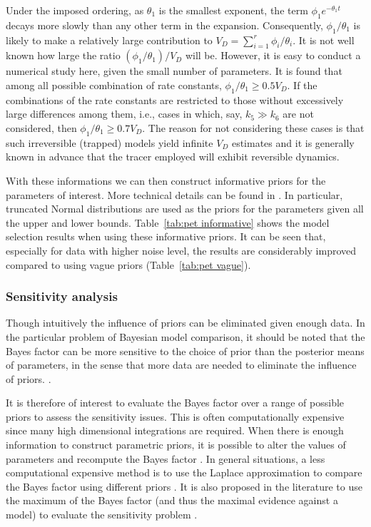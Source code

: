 Under the imposed ordering, as $\theta_1$ is the smallest exponent, the term
$\phi_1e^{-\theta_1 t}$ decays more slowly than any other term in the
expansion. Consequently, $\phi_1/\theta_1$ is likely to make a relatively
large contribution to $V_D = \sum_{i=1}^r \phi_i/\theta_i$. It is not well
known how large the ratio $(\phi_1/\theta_1)/V_D$ will be. However, it is
easy to conduct a numerical study here, given the small number of parameters.
It is found that among all possible combination of rate constants, $\phi_1/
\theta_1 \ge 0.5 V_D$. If the combinations of the rate constants are
restricted to those without excessively large differences among them, i.e.,
cases in which, say, $k_5 \gg k_6$ are not considered, then $\phi_1/\theta_1
\ge 0.7 V_D$. The reason for not considering these cases is that such
irreversible (trapped) models yield infinite $V_D$ estimates and it is
generally known in advance that the tracer employed will exhibit reversible
dynamics.

With these informations we can then construct informative priors for the
parameters of interest. More technical details can be found in
\cite{Zhou2013}. In particular, truncated Normal distributions are used as
the priors for the parameters given all the upper and lower bounds.
Table~\ref{tab:pet informative} shows the model selection results when using
these informative priors. It can be seen that, especially for data with
higher noise level, the results are considerably improved compared to using
vague priors (Table~\ref{tab:pet vague}).



\subsubsection{Sensitivity analysis}
\label{ssub:Sensitivity analysis}

Though intuitively the influence of priors can be eliminated given enough
data. In the particular problem of Bayesian model comparison, it should be
noted that the Bayes factor can be more sensitive to the choice of prior than
the posterior means of parameters, in the sense that more data are needed to
eliminate the influence of priors. \cite{Kass:1993vy,Kass:1995vb}.

It is therefore of interest to evaluate the Bayes factor over a range of
possible priors to assess the sensitivity issues. This is often
computationally expensive since many high dimensional integrations are
required. When there is enough information to construct parametric priors, it
is possible to alter the values of parameters and recompute the Bayes factor
\cite{McCulloch:1991hj}. In general situations, a less computational
expensive method is to use the Laplace approximation to compare the Bayes
factor using different priors \cite{Kass:1992tz}. It is also proposed in the
literature to use the maximum of the Bayes factor (and thus the maximal
evidence against a model) to evaluate the sensitivity problem
\cite{Berger:1987iq}.

